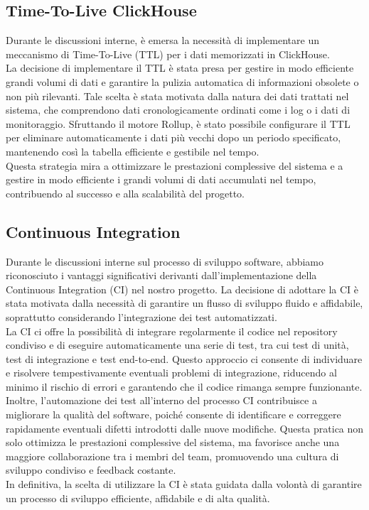 \documentclass{article}
\begin{document}
    \subsection{Time-To-Live ClickHouse}
    Durante le discussioni interne, è emersa la necessità di implementare un meccanismo di Time-To-Live (TTL) per i dati memorizzati in ClickHouse.\\
    La decisione di implementare il TTL è stata presa per gestire in modo efficiente grandi volumi di dati e garantire la pulizia automatica di informazioni obsolete o non più rilevanti. Tale scelta è stata motivata dalla natura dei dati trattati nel sistema, che comprendono dati cronologicamente ordinati come i log o i dati di monitoraggio. Sfruttando il motore Rollup, è stato possibile configurare il TTL per eliminare automaticamente i dati più vecchi dopo un periodo specificato, mantenendo così la tabella efficiente e gestibile nel tempo.\\
    Questa strategia mira a ottimizzare le prestazioni complessive del sistema e a gestire in modo efficiente i grandi volumi di dati accumulati nel tempo, contribuendo al successo e alla scalabilità del progetto.    

    \subsection{Continuous Integration}
    Durante le discussioni interne sul processo di sviluppo software, abbiamo riconosciuto i vantaggi significativi derivanti dall'implementazione della Continuous Integration (CI) nel nostro progetto. La decisione di adottare la CI è stata motivata dalla necessità di garantire un flusso di sviluppo fluido e affidabile, soprattutto considerando l'integrazione dei test automatizzati.\\
    La CI ci offre la possibilità di integrare regolarmente il codice nel repository condiviso e di eseguire automaticamente una serie di test, tra cui test di unità, test di integrazione e test end-to-end. Questo approccio ci consente di individuare e risolvere tempestivamente eventuali problemi di integrazione, riducendo al minimo il rischio di errori e garantendo che il codice rimanga sempre funzionante.\\
    Inoltre, l'automazione dei test all'interno del processo CI contribuisce a migliorare la qualità del software, poiché consente di identificare e correggere rapidamente eventuali difetti introdotti dalle nuove modifiche. Questa pratica non solo ottimizza le prestazioni complessive del sistema, ma favorisce anche una maggiore collaborazione tra i membri del team, promuovendo una cultura di sviluppo condiviso e feedback costante.\\
    In definitiva, la scelta di utilizzare la CI è stata guidata dalla volontà di garantire un processo di sviluppo efficiente, affidabile e di alta qualità.
\end{document}
